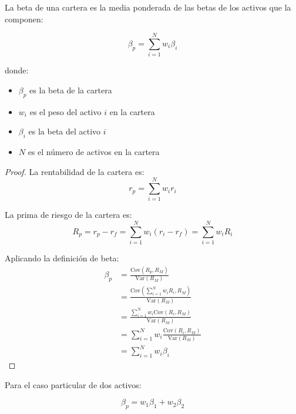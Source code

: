 \begin{teorema}
La beta de una cartera es la media ponderada de las betas de los activos que la componen:

\begin{equation}
\beta_p = \sum_{i=1}^{N} w_i \beta_i
\end{equation}

donde:
\begin{itemize}
\item $\beta_p$ es la beta de la cartera
\item $w_i$ es el peso del activo $i$ en la cartera
\item $\beta_i$ es la beta del activo $i$
\item $N$ es el número de activos en la cartera
\end{itemize}
\end{teorema}

\begin{proof}
La rentabilidad de la cartera es:
\begin{equation}
r_p = \sum_{i=1}^{N} w_i r_i
\end{equation}

La prima de riesgo de la cartera es:
\begin{equation}
R_p = r_p - r_f = \sum_{i=1}^{N} w_i (r_i - r_f) = \sum_{i=1}^{N} w_i R_i
\end{equation}

Aplicando la definición de beta:
\begin{align}
\beta_p &= \frac{\text{Cov}(R_p, R_M)}{\text{Var}(R_M)} \\
&= \frac{\text{Cov}\left(\sum_{i=1}^{N} w_i R_i, R_M\right)}{\text{Var}(R_M)} \\
&= \frac{\sum_{i=1}^{N} w_i \text{Cov}(R_i, R_M)}{\text{Var}(R_M)} \\
&= \sum_{i=1}^{N} w_i \frac{\text{Cov}(R_i, R_M)}{\text{Var}(R_M)} \\
&= \sum_{i=1}^{N} w_i \beta_i
\end{align}
\end{proof}

Para el caso particular de dos activos:

\begin{equation}
\beta_p = w_1 \beta_1 + w_2 \beta_2
\end{equation}

